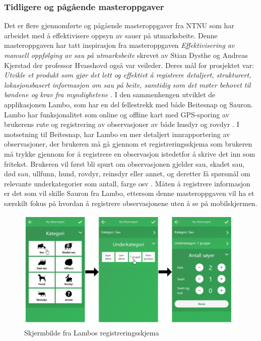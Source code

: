 \subsubsection{Tidligere og pågående masteroppgaver}
Det er flere gjennomførte og pågående masteroppgaver fra NTNU som har arbeidet med å effektivisere oppsyn av sauer på utmarksbeite. Denne masteroppgaven har tatt inspirasjon fra masteroppgaven \textit{Effektivisering av manuell oppfølging av sau på utmarksbeite} \cite{dystheEffektiviseringAvManuell2018} skrevet av Stian Dysthe og Andreas Kjerstad der professor Hvasshovd også var veileder. Deres mål for prosjektet var:
\newline
\newline
\textit{Utvikle et produkt som gjør det lett og effektivt å registrere detaljert, strukturert, lokasjonsbasert informasjon om sau på beite, samtidig som det møter behovet til bøndene og krav fra myndighetene} \cite[~s.13]{dystheEffektiviseringAvManuell2018}.
\newline
\newline
I den sammenhengen utviklet de applikasjonen Lambo, som har en del fellestrekk med både Beitesnap og Sauron. Lambo har funksjonalitet som online og offline kart med GPS-sporing av brukerens rute og registrering av observasjoner av både husdyr og rovdyr \cite{dystheEffektiviseringAvManuell2018}. I motsetning til Beitesnap, har Lambo en mer detaljert innrapportering av observasjoner, der brukeren må gå gjennom et registreringsskjema som brukeren må trykke gjennom for å registrere en observasjon istedetfor å skrive det inn som fritekst. Brukeren vil først bli spurt om observasjonen gjelder sau, skadet sau, død sau, ullfunn, hund, rovdyr, reinsdyr eller annet, og deretter få spørsmål om relevante underkategorier som antall, farge osv \cite[~s.84-85]{dystheEffektiviseringAvManuell2018}. Måten å registrere informasjon er det som vil skille Sauron fra Lambo, ettersom denne masteroppgaven vil ha et særskilt fokus på hvordan å registrere observasjonene uten å se på mobilskjermen.

\begin{figure}[H]
\centering
\captionsetup{width=.8\linewidth}
\includegraphics[scale=0.5]{Figurer/Bilder/lambo.png}
\caption{Skjermbilde fra Lambos registreringsskjema}
\label{fig:lambo}
\end{figure}
 
